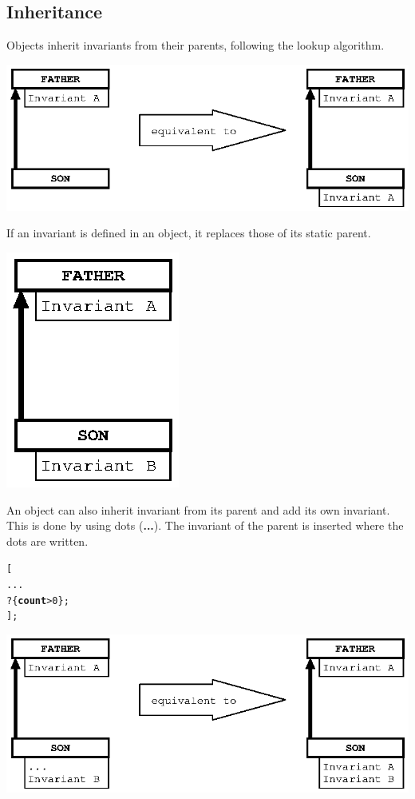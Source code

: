 \documentclass[11pt]{mybook}
\begin{document}
\subsection{Inheritance}
\label{language_reference:contract:inheritance}
Objects inherit invariants from their parents, following the lookup algorithm.
\begin{center}
\includegraphics[scale=1.0]{figures/inherit_invariant1}
\end{center}
If an invariant is defined in an object, it replaces those of its static parent.\\
\begin{center}
\includegraphics[scale=1.0]{figures/inherit_invariant2}
\end{center}
An object can also inherit invariant from its parent and add its own invariant. This is done by using dots ({\bf{}...}).
The invariant of the parent is inserted where the dots are written.
\begin{alltt}
   [
      ...
      ? \{{\bf{}count} > 0\};
   ];
\end{alltt}
 \begin{center}
\includegraphics[scale=1.0]{figures/inherit_invariant3}
\end{center} 
\end{document}

